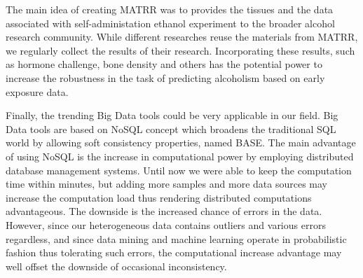 The main idea of creating MATRR was to provides the tissues and the data associated with self-administation ethanol experiment to the broader alcohol research community. While different researches reuse the materials from MATRR, we regularly collect the results of their research. Incorporating these results, such as hormone challenge, bone density and others has the potential power to increase the robustness in the task of predicting alcoholism based on early exposure data. 

Finally, the trending Big Data tools could be very applicable in our field. Big Data tools are based on NoSQL concept which broadens the traditional SQL world by allowing soft consistency properties, named BASE. The main advantage of using NoSQL is the increase in computational power by employing distributed database management systems. Until now we were able to keep the computation time within minutes, but adding more samples and more data sources may increase the computation load thus rendering distributed computations advantageous. The downside is the increased chance of errors in the data. However, since our heterogeneous data contains outliers and various errors regardless, and since data mining and machine learning operate in probabilistic fashion thus tolerating such errors, the computational increase advantage may well offset the downside of occasional inconsistency. 



	